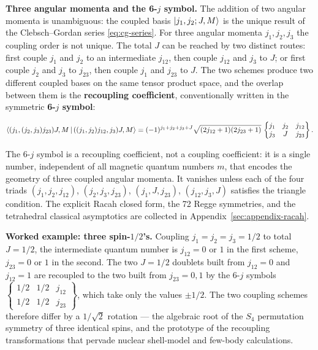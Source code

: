 \medskip\noindent\textbf{Three angular momenta and the 6-$j$ symbol.}
The addition of two angular momenta is unambiguous: the coupled basis $\ket{j_1,j_2;J,M}$ is the unique result of the Clebsch--Gordan series \eqref{eq:cg-series}. For three angular momenta $j_1,j_2,j_3$ the coupling order is not unique. The total $J$ can be reached by two distinct routes: first couple $j_1$ and $j_2$ to an intermediate $j_{12}$, then couple $j_{12}$ and $j_3$ to $J$; or first couple $j_2$ and $j_3$ to $j_{23}$, then couple $j_1$ and $j_{23}$ to $J$. The two schemes produce two different coupled bases on the same tensor product space, and the overlap between them is the \textbf{recoupling coefficient}, conventionally written in the symmetric \textbf{6-$j$ symbol}:
\begin{linenomath}
  \begin{equation}
    \braket{(j_{1},(j_{2},j_{3})j_{23})J,M\,|\,((j_{1},j_{2})j_{12},j_{3})J,M}
    =(-1)^{j_{1}+j_{2}+j_{3}+J}\sqrt{(2j_{12}+1)(2j_{23}+1)}\,
    \begin{Bmatrix}j_{1}&j_{2}&j_{12}\\ j_{3}&J&j_{23}\end{Bmatrix}.
    \label{eq:three-j-recoupling}
  \end{equation}
\end{linenomath}
The 6-$j$ symbol is a recoupling coefficient, not a coupling coefficient: it is a single number, independent of all magnetic quantum numbers $m$, that encodes the geometry of three coupled angular momenta. It vanishes unless each of the four triads $(j_{1},j_{2},j_{12})$, $(j_{2},j_{3},j_{23})$, $(j_{1},J,j_{23})$, $(j_{12},j_{3},J)$ satisfies the triangle condition. The explicit Racah closed form, the 72 Regge symmetries, and the tetrahedral classical asymptotics are collected in Appendix~\ref{sec:appendix-racah}.

\medskip\noindent\textbf{Worked example: three spin-$1/2$'s.} Coupling $j_{1}=j_{2}=j_{3}=1/2$ to total $J=1/2$, the intermediate quantum number is $j_{12}=0$ or $1$ in the first scheme, $j_{23}=0$ or $1$ in the second. The two $J=1/2$ doublets built from $j_{12}=0$ and $j_{12}=1$ are recoupled to the two built from $j_{23}=0,1$ by the 6-$j$ symbols $\begin{Bmatrix}1/2&1/2&j_{12}\\ 1/2&1/2&j_{23}\end{Bmatrix}$, which take only the values $\pm1/2$. The two coupling schemes therefore differ by a $1/\sqrt2$ rotation --- the algebraic root of the $S_{4}$ permutation symmetry of three identical spins, and the prototype of the recoupling transformations that pervade nuclear shell-model and few-body calculations.

